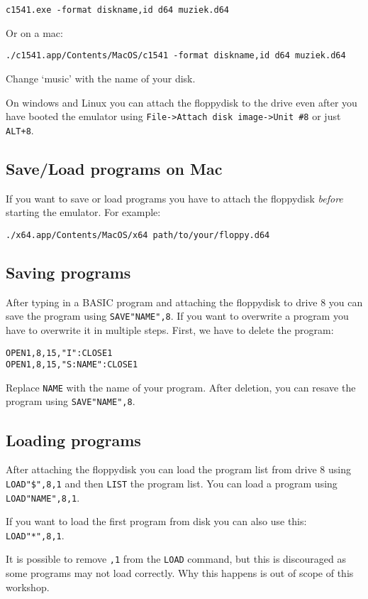 \begin{lstlisting}
c1541.exe -format diskname,id d64 muziek.d64
\end{lstlisting}

Or on a mac:

\begin{lstlisting}
./c1541.app/Contents/MacOS/c1541 -format diskname,id d64 muziek.d64
\end{lstlisting}

Change `music' with the name of your disk.

On windows and Linux you can attach the floppydisk to the drive even after you have booted the emulator using \verb:File->Attach disk image->Unit #8: or just \verb:ALT+8:.

\subsection{Save/Load programs on Mac}

If you want to save or load programs you have to attach the floppydisk \emph{before} starting the emulator. For example:

\begin{lstlisting}
./x64.app/Contents/MacOS/x64 path/to/your/floppy.d64
\end{lstlisting}

\subsection{Saving programs}

After typing in a BASIC program and attaching the floppydisk to drive 8 you can save the program using \verb:SAVE"NAME",8:.
If you want to overwrite a program you have to overwrite it in multiple steps.
First, we have to delete the program:

\begin{lstlisting}
OPEN1,8,15,"I":CLOSE1
OPEN1,8,15,"S:NAME":CLOSE1
\end{lstlisting}

Replace \verb:NAME: with the name of your program.
After deletion, you can resave the program using \verb:SAVE"NAME",8:.

\subsection{Loading programs}

After attaching the floppydisk you can load the program list from drive 8 using \verb:LOAD"$",8,1: and then \verb:LIST: the program list.
You can load a program using \verb:LOAD"NAME",8,1:.

If you want to load the first program from disk you can also use this: \verb:LOAD"*",8,1:.

It is possible to remove \verb:,1: from the \verb:LOAD: command, but this is discouraged as some programs may not load correctly.
Why this happens is out of scope of this workshop.
